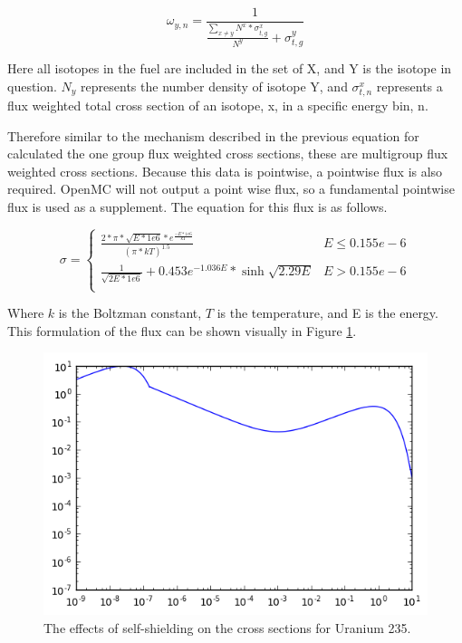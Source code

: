 \documentclass{article}
\begin{document}
$$\omega_{y,n}=\frac{1}{\frac{\sum_{x\neq y}N^x * \sigma_{t,g}^x}{N^y}+\sigma_{t,g}^y}$$

Here all isotopes in the fuel are included in the set of X, and Y is the isotope in question. $N_y$ represents the number density of isotope Y, and $\sigma_{t,n}^x$ represents a flux weighted total cross section of an isotope, x, in a specific energy bin, n.

Therefore similar to the mechanism described in the previous equation for calculated the one group flux weighted cross sections, these are multigroup flux weighted cross sections. Because this data is pointwise, a pointwise flux is also required. OpenMC will not output a point wise flux, so a fundamental pointwise flux is used as a supplement. The equation for this flux is as follows.

\large

\[ \sigma = \begin{cases}
      \frac{2*\pi*\sqrt{E*1e6}*e^{\frac{-E*1e6}{kT}}}{(\pi*kT)^1.5} & E\leq 0.155e-6 \\
      \frac{1}{\sqrt{2E*1e6}} + 0.453e^{-1.036E}*\sinh{\sqrt{2.29E}} & E > 0.155e-6 \\
   \end{cases}
\]

Where $k$ is the Boltzman constant, $T$ is the temperature, and E is the energy. This formulation of the flux can be shown visually in Figure \ref{fig:therm}.
\begin{figure}[h]
  \center
  \includegraphics[scale=0.8]{thermspec.png}
  \caption{The effects of self-shielding on the cross sections for Uranium 235.}
  \label{fig:therm}
\end{figure}
\end{document}
